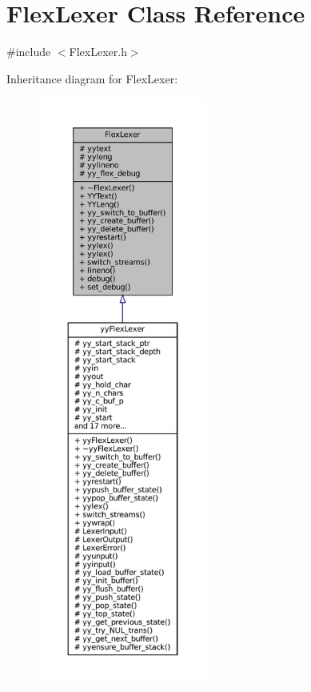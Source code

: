 \hypertarget{classFlexLexer}{}\section{Flex\+Lexer Class Reference}
\label{classFlexLexer}


{\ttfamily \#include $<$Flex\+Lexer.\+h$>$}



Inheritance diagram for Flex\+Lexer\+:
\nopagebreak
\begin{figure}[H]
\begin{center}
\leavevmode
\includegraphics[height=550pt]{classFlexLexer__inherit__graph}
\end{center}
\end{figure}


